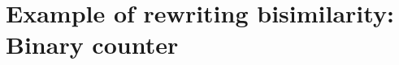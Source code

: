


\section{Example of rewriting bisimilarity: Binary counter}\label{sec:ordered-bisimilarity:counter}

